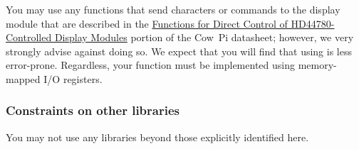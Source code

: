 You may use any functions that send characters or commands to the display module that are described in the \href{https://cow-pi.readthedocs.io/en/latest/library.html}{Functions for Direct Control of HD44780-Controlled Display Modules} portion of the Cow~Pi datasheet;
however, we very strongly advise against doing so.
We expect that you will find that using  is less error-prone.
Regardless, your  function must be implemented using memory-mapped I/O registers.

\subsubsection{Constraints on other libraries}

You may not use any libraries beyond those explicitly identified here.


